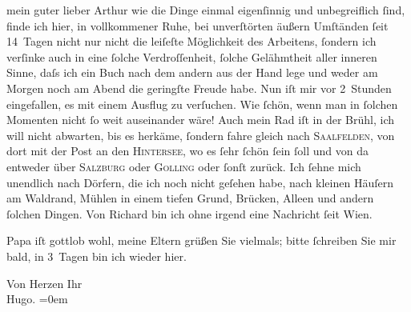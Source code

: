 \pstart{}mein guter lieber Arthur\pend\vspace{0.5em}
\pstart
           wie die Dinge einmal eigenſinnig und unbegreiflich ſind, finde ich hier, in
               vollkommener Ruhe, bei unverſtörten äußern Umſtänden ſeit 14 Tagen nicht nur nicht
               die leiſeſte Möglichkeit des Arbeitens, ſondern ich verſinke auch in eine ſolche
               Verdroſſenheit, ſolche Gelähmtheit aller inneren Sinne, {\pb}daſs ich ein Buch nach dem andern
               aus der Hand lege und weder am Morgen noch am Abend die geringſte Freude habe. Nun
               iſt mir vor 2 Stunden eingefallen, es mit einem Ausflug zu verſuchen. Wie ſchön, wenn
               man in ſolchen Momenten nicht ſo weit auseinander wäre! Auch mein Rad iſt in der {\pb}Brühl, ich will nicht abwarten, bis es herkäme,
               ſondern fahre gleich nach \textsc{Saalfelden}, von dort mit der Post an den \textsc{Hintersee}, wo es ſehr ſchön ſein ſoll und von da entweder über \textsc{Salzburg} oder \textsc{Golling} oder ſonſt zurück. Ich ſehne mich unendlich nach Dörfern, die ich noch nicht
               geſehen habe, nach kleinen Häuſern am {\pb}Waldrand, Mühlen in einem tiefen
               Grund, Brücken, Alleen und andern ſolchen Dingen. Von Richard bin ich ohne irgend eine Nachricht ſeit Wien.\pend
           
\pstart
           Papa iſt gottlob wohl, meine
                  Eltern grüßen
               Sie vielmals; bitte ſchreiben Sie mir bald, in 3 Tagen bin ich wieder hier.\pend
           
\pstart
           Von Herzen Ihr{\\[\baselineskip]}\spacefill\mbox{Hugo.}\pend
           \leftskip=0em{}\endnumbering{}  
      